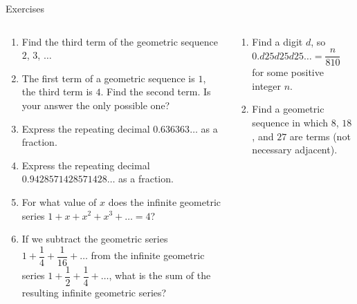 \documentclass[9pt,aspectratio=169]{beamer}
\begin{document}
\begin{frame}{Exercises}
  \begin{columns}[T]
    \begin{column}{0.5\textwidth}
      \begin{enumerate}
        \item Find the third term of the geometric sequence $2$, $3$, $\ldots$
        \item The first term of a geometric sequence is $1$, the third term is $4$. Find the second term. Is your answer the only possible one?
        \item Express the repeating decimal $0.636363\ldots$ as a fraction.
        \item Express the repeating decimal $0.9428571428571428\ldots$ as a fraction.
        \item For what value of $x$ does the infinite geometric series $1 + x + x^2 + x^3 + \ldots = 4$?
        \item If we subtract the geometric series $1 + \dfrac{1}{4} + \dfrac{1}{16} + \ldots$ from the infinite geometric series $1 + \dfrac{1}{2} + \dfrac{1}{4} + \ldots$, what is the sum of the resulting infinite geometric series?
        \seti
      \end{enumerate}
    \end{column}
    \begin{column}{0.5\textwidth}
      \begin{enumerate}
        \conti
        \item Find a digit $d$, so $0.d25d25d25\ldots = \dfrac{n}{810}$ for some positive integer $n$.
        \item Find a geometric sequence in which $8$, $18$, and $27$ are terms (not necessary adjacent).
      \end{enumerate}
    \end{column}
  \end{columns}
\end{frame}
\end{document}
